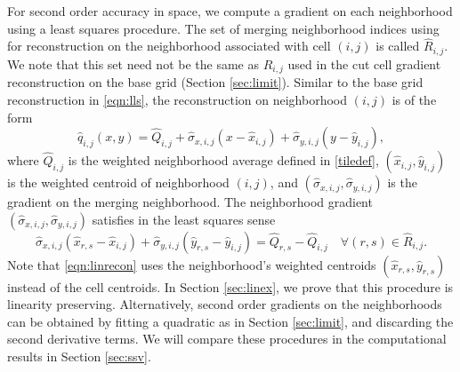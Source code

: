 For second order accuracy in space, we compute a gradient on each neighborhood using a least squares procedure.
The set of merging neighborhood indices using for reconstruction on the
neighborhood associated with cell $(i,j)$ is called $\widehat R_{i,j}$.
We note that this set need not be the same as $R_{i,j}$ used in the cut cell gradient reconstruction on the base grid (Section \ref{sec:limit}). 
Similar to the base grid reconstruction in \eqref{eqn:lls}, the reconstruction on neighborhood $(i,j)$ is of the form
\begin{equation}\label{eq:qrecon}
\widehat{q}_{i,j}(x,y) = \widehat{Q}_{i, j} + \widehat{\sigma}_{x,i,j}(x - \widehat{x}_{i,j}) + \widehat{\sigma}_{y,i,j}(y - \widehat{y}_{i,j}),
\end{equation}
where $\widehat{Q}_{i, j}$ is the weighted neighborhood average defined in \eqref{tiledef}, $(\widehat{x}_{i,j},\widehat{y}_{i,j})$ is the weighted centroid of neighborhood $(i,j)$, and $(\widehat{\sigma}_{x,i,j},\widehat{\sigma}_{y,i,j})$ is 
the gradient on the merging neighborhood.
The neighborhood gradient $(\widehat{\sigma}_{x,i,j},\widehat{\sigma}_{y,i,j})$ satisfies in the least squares sense
\begin{equation}\label{eqn:linrecon}
\widehat{\sigma}_{x,i,j}(\widehat{x}_{r,s} - \widehat{x}_{i,j}) +
\widehat{\sigma}_{y,i,j}(\widehat{y}_{r,s} - \widehat{y}_{i,j})=
\widehat{Q}_{r,s} - \widehat{Q}_{i, j} \quad \forall (r,s) \in \widehat{R}_{i,j}.
\end{equation}
Note that \eqref{eqn:linrecon} uses the neighborhood's weighted centroids $(\widehat{x}_{r,s},\widehat{y}_{r,s})$ instead of the cell centroids.  In Section \ref{sec:linex}, we prove that this procedure is linearity preserving.
Alternatively, second order gradients on the neighborhoods can be obtained by fitting a quadratic
as in Section \ref{sec:limit}, and discarding the second derivative terms.
We will compare these procedures in the computational results in Section \ref{sec:ssv}.





